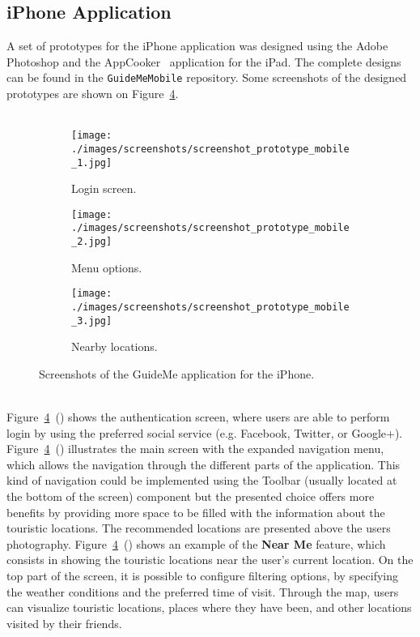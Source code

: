 \subsection{iPhone Application}
\label{subsec:iPhoneApp}
A set of prototypes for the iPhone application was designed using the Adobe Photoshop and the AppCooker~\cite{appCooker} application for the iPad. The complete designs can be found in the \verb"GuideMeMobile" repository. Some screenshots of the designed prototypes are shown on Figure~\ref{fig:guideMeScreenshots}.\\
\\
\begin{figure}
        \centering
        \begin{subfigure}[b]{0.25\textwidth}
                \centering
                \texttt{[image: ./images/screenshots/screenshot\_prototype\_mobile\_1.jpg]}
                \caption{Login screen.}
                \label{fig:guidemeiPhoneScreenshots1}
        \end{subfigure}%
        \qquad
        \begin{subfigure}[b]{0.25\textwidth}
                \centering
                \texttt{[image: ./images/screenshots/screenshot\_prototype\_mobile\_2.jpg]}
                \caption{Menu options.}
                \label{fig:guidemeiPhoneScreenshots2}
        \end{subfigure}
        \qquad
        \begin{subfigure}[b]{0.25\textwidth}
                \centering
                \texttt{[image: ./images/screenshots/screenshot\_prototype\_mobile\_3.jpg]}
                \caption{Nearby locations.}
                \label{fig:guidemeiPhoneScreenshots3}
        \end{subfigure}
        \caption{Screenshots of the GuideMe application for the iPhone.}
        \label{fig:guideMeScreenshots}
\end{figure}
\\
Figure~\ref{fig:guideMeScreenshots}~() shows the authentication screen, where users are able to perform login by using the preferred social service (e.g. Facebook, Twitter, or Google+). Figure~\ref{fig:guideMeScreenshots}~() illustrates the main screen with the expanded navigation menu, which allows the navigation through the different parts of the application. This kind of navigation could be implemented using the Toolbar (usually located at the bottom of the screen) component but the presented choice offers more benefits by providing more space to be filled with the information about the touristic locations. The recommended locations are presented above the users photography. Figure~\ref{fig:guideMeScreenshots}~() shows an example of the \textbf{Near Me} feature, which consists in showing the touristic locations near the user's current location. On the top part of the screen, it is possible to configure filtering options, by specifying the weather conditions and the preferred time of visit. Through the map, users can visualize touristic locations, places where they have been, and other locations visited by their friends.\\

